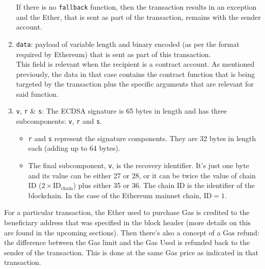 \begin{enumerate}
  If there is no \texttt{fallback} function, then the transaction
  results in an exception and the Ether, that is sent as part of the
  transaction, remains with the sender account.
\item
  \texttt{data}: payload of variable length and binary encoded (as per
  the format required by Ethereum) that is sent as part of this
  transaction.\\

  This field is relevant when the recipient is a contract account. As
  mentioned previously, the data in that case contains the contract
  function that is being targeted by the transaction plus the specific
  arguments that are relevant for said function.
\item
  \texttt{v}, \texttt{r} \& \texttt{s}: The ECDSA signature is 65 bytes
  in length and has three subcomponents: \texttt{v}, \texttt{r} and
  \texttt{s}.

  \begin{itemize}
  \tightlist
  \item
    \texttt{r} and \texttt{s} represent the signature components. They
    are 32 bytes in length each (adding up to 64 bytes).
  \item
    The final subcomponent, \texttt{v}, is the recovery identifier. It's
    just one byte and its value can be either 27 or 28, or it can be
    twice the value of chain ID ($2\times\text{ID}_\text{chain}$) plus
    either 35 or 36. The chain ID is the identifier of the blockchain.
    In the case of the Ethereum mainnet chain, $\text{ID}=1$.
  \end{itemize}
\end{enumerate}

For a particular transaction, the Ether used to purchase Gas is credited
to the beneficiary address that was specified in the block header (more
details on this are found in the upcoming sections). Then there's also a
concept of a Gas refund: the difference between the Gas limit and the
Gas Used is refunded back to the sender of the transaction. This is done
at the same Gas price as indicated in that transaction.
